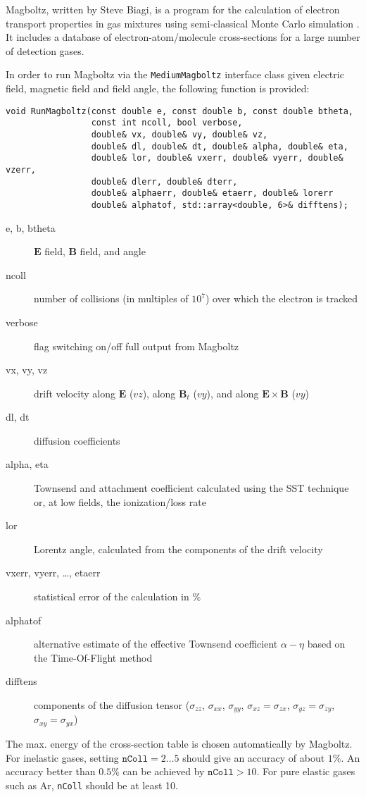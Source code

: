 Magboltz, written by Steve Biagi, is a program 
for the calculation of electron transport properties in gas 
mixtures using semi-classical Monte Carlo simulation
\cite{Biagi1999}. 
It includes a database of electron-atom/molecule cross-sections 
for a large number of detection gases. 

In order to run Magboltz via the \texttt{MediumMagboltz} interface class
given electric field, magnetic field and field angle, the following 
function is provided:
\begin{lstlisting}
void RunMagboltz(const double e, const double b, const double btheta,
                 const int ncoll, bool verbose, 
                 double& vx, double& vy, double& vz,
                 double& dl, double& dt, double& alpha, double& eta,
                 double& lor, double& vxerr, double& vyerr, double& vzerr,
                 double& dlerr, double& dterr,
                 double& alphaerr, double& etaerr, double& lorerr 
                 double& alphatof, std::array<double, 6>& difftens);
\end{lstlisting}
\begin{description}
  \item[e, b, btheta] 
    \(\mathbf{E}\) field, \(\mathbf{B}\) field, and  angle
  \item[ncoll] 
    number of collisions (in multiples of \(10^{7}\)) over which 
    the electron is tracked
  \item[verbose] 
    flag switching on/off full output from Magboltz
  \item[vx, vy, vz] 
    drift velocity along \(\mathbf{E}\) (\(vz\)), 
    along \(\mathbf{B}_{t}\) (\(vy\)), and  
    along \(\mathbf{E} \times \mathbf{B}\) (\(vy\))
  \item[dl, dt]
    diffusion coefficients
  \item[alpha, eta]
    Townsend and attachment coefficient calculated using the
    SST technique or, at low fields, the ionization/loss rate
  \item[lor]
    Lorentz angle, calculated from the components of the drift velocity
  \item[vxerr, vyerr, \dots, etaerr] 
    statistical error of the calculation in \(\%\)
  \item[alphatof]
    alternative estimate of the effective Townsend coefficient 
    \(\alpha - \eta\) based on the Time-Of-Flight method 
  \item[difftens]
    components of the diffusion tensor ($\sigma_{zz}$, $\sigma_{xx}$, 
    $\sigma_{yy}$, $\sigma_{xz} = \sigma_{zx}$, $\sigma_{yz} = \sigma_{zy}$,
    $\sigma_{xy} = \sigma_{yx}$) 
\end{description}
The max. energy of the cross-section table  
is chosen automatically by Magboltz. 
For inelastic gases, setting \(\texttt{nColl} = 2 \dots 5\)
should give an accuracy of about \(1\%\). 
An accuracy better than \(0.5\%\) can be achieved by 
\(\texttt{nColl} > 10\). 
For pure elastic gases such as Ar, \texttt{nColl} should 
be at least 10.  

